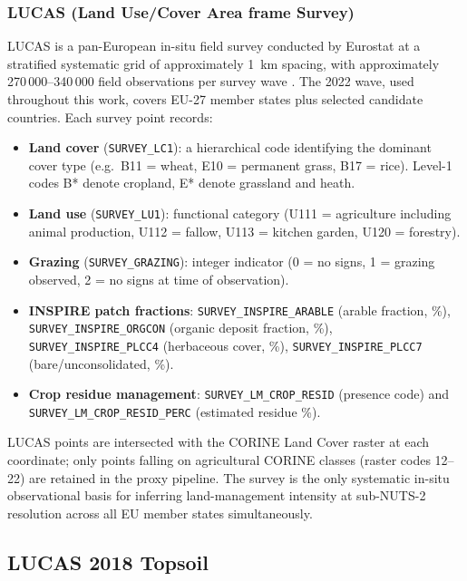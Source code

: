\subsubsection*{LUCAS (Land Use/Cover Area frame Survey)}
\label{app:lucas}
LUCAS is a pan-European in-situ field survey conducted by Eurostat at a stratified systematic grid of approximately 1~km spacing, with approximately 270\,000--340\,000 field observations per survey wave \citep{lucas_dataset}. The 2022 wave, used throughout this work, covers EU-27 member states plus selected candidate countries. Each survey point records:
\begin{itemize}
  \item \textbf{Land cover} (\texttt{SURVEY\_LC1}): a hierarchical code identifying the dominant cover type (e.g.\ B11 = wheat, E10 = permanent grass, B17 = rice). Level-1 codes B* denote cropland, E* denote grassland and heath.
  \item \textbf{Land use} (\texttt{SURVEY\_LU1}): functional category (U111 = agriculture including animal production, U112 = fallow, U113 = kitchen garden, U120 = forestry).
  \item \textbf{Grazing} (\texttt{SURVEY\_GRAZING}): integer indicator (0 = no signs, 1 = grazing observed, 2 = no signs at time of observation).
  \item \textbf{INSPIRE patch fractions}: \texttt{SURVEY\_INSPIRE\_ARABLE} (arable fraction, \%), \texttt{SURVEY\_INSPIRE\_ORGCON} (organic deposit fraction, \%), \texttt{SURVEY\_INSPIRE\_PLCC4} (herbaceous cover, \%), \texttt{SURVEY\_INSPIRE\_PLCC7} (bare/unconsolidated, \%).
  \item \textbf{Crop residue management}: \texttt{SURVEY\_LM\_CROP\_RESID} (presence code) and \texttt{SURVEY\_LM\_CROP\_RESID\_PERC} (estimated residue \%).
\end{itemize}
LUCAS points are intersected with the CORINE Land Cover raster at each coordinate; only points falling on agricultural CORINE classes (raster codes 12--22) are retained in the proxy pipeline. The survey is the only systematic in-situ observational basis for inferring land-management intensity at sub-NUTS-2 resolution across all EU member states simultaneously.

\subsection{LUCAS 2018 Topsoil}
\label{app:lucas_topsoil}
